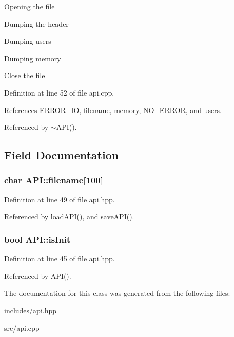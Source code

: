  
\begin{DoxyEnumerate}
\item Opening the file


\item Dumping the header


\item Dumping users


\item Dumping memory


\item Close the file


\end{DoxyEnumerate}

Definition at line 52 of file api.\+cpp.



References E\+R\+R\+O\+R\+\_\+\+I\+O, filename, memory, N\+O\+\_\+\+E\+R\+R\+O\+R, and users.



Referenced by $\sim$\+A\+P\+I().



\subsection{Field Documentation}
\hypertarget{classAPI_aa4e36aeea94c8fae7fe0b2a2db58d06b}{}
\subsubsection[{filename}]{\setlength{\rightskip}{0pt plus 5cm}char A\+P\+I\+::filename\mbox{[}100\mbox{]}\hspace{0.3cm}{\ttfamily [private]}}\label{classAPI_aa4e36aeea94c8fae7fe0b2a2db58d06b}


Definition at line 49 of file api.\+hpp.



Referenced by load\+A\+P\+I(), and save\+A\+P\+I().

\hypertarget{classAPI_a197a1a46641b76e5eb42daec3667d13e}{}
\subsubsection[{is\+Init}]{\setlength{\rightskip}{0pt plus 5cm}bool A\+P\+I\+::is\+Init\hspace{0.3cm}{\ttfamily [private]}}\label{classAPI_a197a1a46641b76e5eb42daec3667d13e}


Definition at line 45 of file api.\+hpp.



Referenced by A\+P\+I().



The documentation for this class was generated from the following files\+:\begin{DoxyCompactItemize}
\item 
includes/\hyperlink{api_8hpp}{api.\+hpp}\item 
src/api.\+cpp\end{DoxyCompactItemize}
